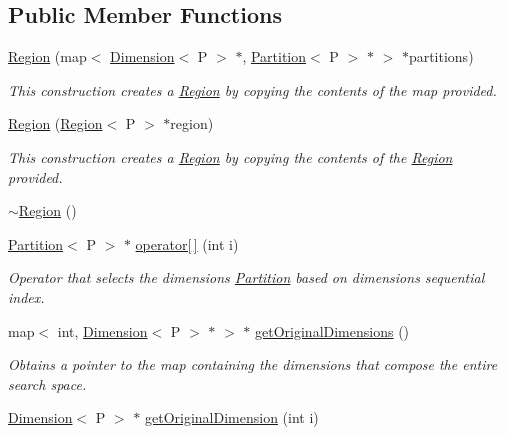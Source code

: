 \subsection*{Public Member Functions}
\begin{DoxyCompactItemize}
\item 
\hyperlink{classRegion_a6c9521953dcff0ff12c0fc8dadd3767c}{Region} (map$<$ \hyperlink{classDimension}{Dimension}$<$ P $>$ $\ast$, \hyperlink{classPartition}{Partition}$<$ P $>$ $\ast$ $>$ $\ast$partitions)
\begin{DoxyCompactList}\small\item\em This construction creates a \hyperlink{classRegion}{Region} by copying the contents of the map provided. \end{DoxyCompactList}\item 
\hyperlink{classRegion_afcb2c437cfdafb0aa43a7771260ead63}{Region} (\hyperlink{classRegion}{Region}$<$ P $>$ $\ast$region)
\begin{DoxyCompactList}\small\item\em This construction creates a \hyperlink{classRegion}{Region} by copying the contents of the \hyperlink{classRegion}{Region} provided. \end{DoxyCompactList}\item 
\hyperlink{classRegion_aa563037c30f158902493dc8bc531329f}{$\sim$\+Region} ()
\item 
\hyperlink{classPartition}{Partition}$<$ P $>$ $\ast$ \hyperlink{classRegion_a2cb409d3900e9bf37970b19eb9d80262}{operator\mbox{[}$\,$\mbox{]}} (int i)
\begin{DoxyCompactList}\small\item\em Operator that selects the dimension\textquotesingle{}s \hyperlink{classPartition}{Partition} based on dimension\textquotesingle{}s sequential index. \end{DoxyCompactList}\item 
map$<$ int, \hyperlink{classDimension}{Dimension}$<$ P $>$ $\ast$ $>$ $\ast$ \hyperlink{classRegion_aed7a4120591db745b5b424fb94588294}{get\+Original\+Dimensions} ()
\begin{DoxyCompactList}\small\item\em Obtains a pointer to the map containing the dimensions that compose the entire search space. \end{DoxyCompactList}\item 
\hyperlink{classDimension}{Dimension}$<$ P $>$ $\ast$ \hyperlink{classRegion_a300afb04c957e821d362c358253130b8}{get\+Original\+Dimension} (int i)

\end{DoxyCompactItemize}
